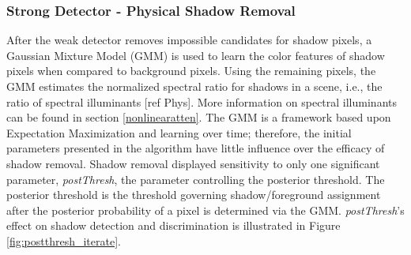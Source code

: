 \documentclass[12pt]{report}
\begin{document}
\subsubsection{Strong Detector - Physical Shadow Removal}

After the weak detector removes impossible candidates for shadow pixels, a Gaussian Mixture Model (GMM) is used to learn the color features of shadow pixels when compared to background pixels. Using the remaining pixels, the GMM estimates the normalized spectral ratio for shadows in a scene, i.e., the ratio of spectral illuminants [ref Phys]. More information on spectral illuminants can be found in section \ref{nonlinearatten}. The GMM is a framework based upon Expectation Maximization and learning over time; therefore, the initial parameters presented in the algorithm have little influence over the efficacy of shadow removal. Shadow removal displayed sensitivity to only one significant parameter, \textit{postThresh}, the parameter controlling the posterior threshold. The posterior threshold is the threshold governing shadow/foreground assignment after the posterior probability of a pixel is determined via the GMM. \textit{postThresh}'s effect on shadow detection and discrimination is illustrated in Figure \ref{fig:postthresh_iterate}.
\end{document}
